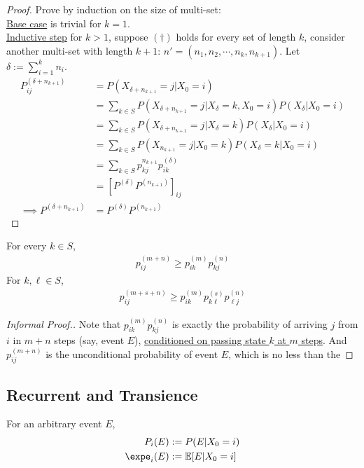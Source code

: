 \documentclass{article}
\begin{document}
    \begin{proof}
    	Prove by induction on the size of multi-set: \\
    	\ul{Base case} is trivial for $k=1$. \\
    	\ul{Inductive step} for $k > 1$, suppose $(\dagger)$ holds for every set of length $k$, consider another multi-set with length $k+1$: $n' = (n_1, n_2, \cdots, n_k, n_{k+1})$. Let $\delta := \sum_{i=1}^k n_i$.
    	\begin{align}
    		P^{(\delta + n_{k+1})}_{ij}
    		&= P(X_{\delta + n_{k+1}}=j|X_0=i) \\
    		&= \sum_{k \in S} P(X_{\delta + n_{k+1}}=j|X_\delta=k, X_0=i) P(X_\delta | X_0=i) \\
    		&= \sum_{k \in S} P(X_{\delta + n_{k+1}}=j|X_\delta=k) P(X_\delta | X_0=i) \\
    		&= \sum_{k \in S} P(X_{n_{k+1}}=j|X_0=k) P(X_\delta=k | X_0=i) \\
    		&= \sum_{k \in S} p^{n_{k+1}}_{kj} p^{(\delta)}_{ik} \\
    		&= [P^{(\delta)} P^{(n_{k+1})}]_{ij} \\
    		\implies P^{(\delta + n_{k+1})} &= P^{(\delta)} P^{(n_{k+1})}
    	\end{align}
    \end{proof}
    
    \begin{corollary}
    	For every $k \in S$,
    	\begin{align}
    		p_{ij}^{(m+n)} \geq p_{ik}^{(m)} p_{kj}^{(n)}
    	\end{align}
    	For $k,\ell \in S$,
    	\begin{align}
    		p_{ij}^{(m+s+n)} \geq p_{ik}^{(m)} p_{k\ell}^{(s)} p_{\ell j}^{(n)}
    	\end{align}
    \end{corollary}

	\begin{proof}[Informal Proof.]
		Note that $p_{ik}^{(m)} p_{kj}^{(n)}$ is exactly the probability of arriving $j$ from $i$ in $m+n$ steps (say, event $E$), \ul{conditioned on passing state $k$ at $m$ steps}. And $p_{ij}^{(m+n)}$ is the unconditional probability of event $E$, which is no less than the 
	\end{proof}

	\subsection{Recurrent and Transience}
	\begin{notation}
		For an arbitrary event $E$,
		\begin{align}
			P_i(E) &:= P(E|X_0=i) \\
			\expe_i(E) &:= \expect{E|X_0=i}
		\end{align}
	\end{notation}
    
\end{document}
